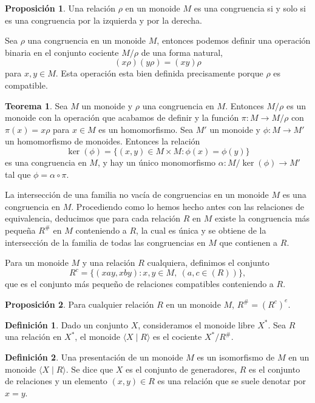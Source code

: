\documentclass[12pt]{book}
\theoremstyle{definition}
\newtheorem{defi}{Definición}[section]
\newtheorem{teor}{Teorema}[section]
\newtheorem{prop}{Proposición}[section]
\begin{document}
\begin{prop}
Una relación $\rho$ en un monoide $M$ es una congruencia si y solo si es una congruencia por la izquierda y por la derecha.
\end{prop}

Sea $\rho$ una congruencia en un monoide $M$, entonces podemos definir una operación binaria en el conjunto cociente $M/\rho$ de una forma natural,
$$(x\rho)(y\rho)=(xy)\rho$$
para $x,y\in M$. Esta operación esta bien definida precisamente porque $\rho$ es compatible.

\begin{teor}
Sea $M$ un monoide y $\rho$ una congruencia en $M$. Entonces $M/\rho$ es un monoide con la operación que acabamos de definir y la función $\pi:M\rightarrow M/\rho$ con $\pi(x)=x\rho$ para $x\in M$ es un homomorfismo.
Sea $M'$ un monoide y $\phi:M\rightarrow M'$ un homomorfismo de monoides. Entonces la relación
$$\ker(\phi)=\{(x,y)\in M\times M: \phi(x)=\phi(y)\}$$
es una congruencia en $M$, y hay un único monomorfismo $\alpha:M/\ker(\phi)\rightarrow M'$ tal que $\phi=\alpha\circ\pi$.
\end{teor}

La intersección de una familia no vacía de congruencias en un monoide $M$ es una congruencia en $M$. Procediendo como lo hemos hecho antes con las relaciones de equivalencia, deducimos que para cada relación $R$ en $M$ existe la congruencia más pequeña $R^\#$ en $M$ conteniendo a $R$, la cual es única y se obtiene de la intersección de la familia de todas las congruencias en $M$ que contienen a $R$.

Para un monoide $M$ y una relación $R$ cualquiera, definimos el conjunto
$$R^c=\{(xay,xby):x,y\in M,\ (a,c\in(R))\},$$
que es el conjunto más pequeño de relaciones compatibles conteniendo a $R$.

\begin{prop}
Para cualquier relación $R$ en un monoide $M$, $R^\#=(R^c)^e$.
\end{prop}

\begin{defi}
Dado un conjunto $X$, consideramos el monoide libre $X^*$. Sea $R$ una relación en $X^*$, el monoide $\langle X\mid R\rangle$ es el cociente $X^*/R^\#$.
\end{defi}

\begin{defi}
Una presentación de un monoide $M$ es un isomorfismo de $M$ en un monoide $\langle X\mid R\rangle$. Se dice que $X$ es el conjunto de generadores, $R$ es el conjunto de relaciones y un elemento $(x,y)\in R$ es una relación que se suele denotar por $x=y$.
\end{defi}
\end{document}
